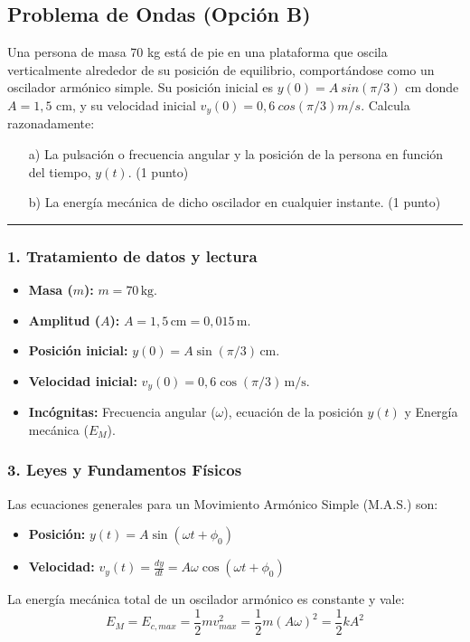\subsection{Problema de Ondas (Opción B)}
\label{subsec:B2_2016_jun_ord_re}

\begin{cajaenunciado}
Una persona de masa 70 kg está de pie en una plataforma que oscila verticalmente alrededor de su posición de equilibrio, comportándose como un oscilador armónico simple. Su posición inicial es $y(0)=A~sin(\pi/3)$ cm donde $A=1,5$ cm, y su velocidad inicial $v_{y}(0)=0,6~cos(\pi/3)m/s$. Calcula razonadamente:
\begin{enumerate}
    \item[a)] La pulsación o frecuencia angular y la posición de la persona en función del tiempo, $y(t)$. (1 punto)
    \item[b)] La energía mecánica de dicho oscilador en cualquier instante. (1 punto)
\end{enumerate}
\end{cajaenunciado}
\hrule

\subsubsection*{1. Tratamiento de datos y lectura}
\begin{itemize}
    \item \textbf{Masa ($m$):} $m=70\,\text{kg}$.
    \item \textbf{Amplitud ($A$):} $A=1,5\,\text{cm} = 0,015\,\text{m}$.
    \item \textbf{Posición inicial:} $y(0) = A \sin(\pi/3)\,\text{cm}$.
    \item \textbf{Velocidad inicial:} $v_y(0) = 0,6 \cos(\pi/3)\,\text{m/s}$.
    \item \textbf{Incógnitas:} Frecuencia angular ($\omega$), ecuación de la posición $y(t)$ y Energía mecánica ($E_M$).
\end{itemize}

\subsubsection*{3. Leyes y Fundamentos Físicos}
Las ecuaciones generales para un Movimiento Armónico Simple (M.A.S.) son:
\begin{itemize}
    \item \textbf{Posición:} $y(t) = A\sin(\omega t + \phi_0)$
    \item \textbf{Velocidad:} $v_y(t) = \frac{dy}{dt} = A\omega\cos(\omega t + \phi_0)$
\end{itemize}
La energía mecánica total de un oscilador armónico es constante y vale:
$$ E_M = E_{c,max} = \frac{1}{2}m v_{max}^2 = \frac{1}{2}m (A\omega)^2 = \frac{1}{2}kA^2 $$

